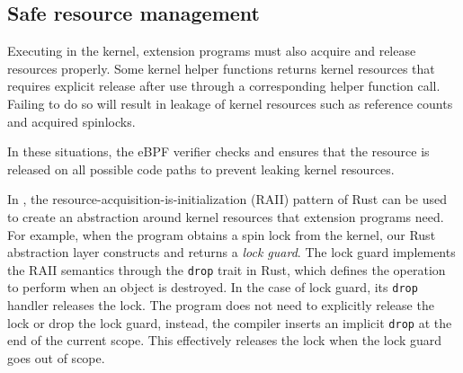\subsection{Safe resource management}
Executing in the kernel, extension programs must also acquire and release
    resources properly.
Some kernel helper functions returns kernel resources that requires
    explicit release after use through a corresponding helper function call.
Failing to do so will result in leakage of kernel resources such as reference
    counts and acquired spinlocks.

In these situations, the eBPF verifier checks and ensures that the resource is
    released on all possible code paths to prevent leaking kernel resources.

In \projname{}, the resource-acquisition-is-initialization (RAII) pattern of
    Rust can be used to create an abstraction around kernel resources that
    extension programs need.
For example, when the program obtains a spin lock from the kernel, our Rust
    abstraction layer constructs and returns a \emph{lock guard}.
The lock guard implements the RAII semantics through the \texttt{drop} trait in
    Rust, which defines the operation to perform when an object is destroyed.
In the case of lock guard, its \texttt{drop} handler releases the lock.
The program does not need to explicitly release the lock or drop the lock
    guard, instead, the compiler inserts an implicit \texttt{drop} at the end
    of the current scope. This effectively releases the lock when the lock
    guard goes out of scope.

